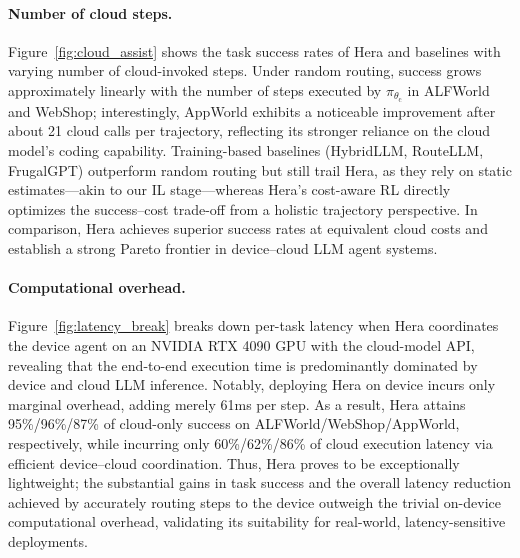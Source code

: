 \documentclass{article}
\newcommand{\needrev}[1]{{\color{darkgreen}#1}} %
\newcommand{\needrev}[1]{#1} %
\newcommand{\name}{Hera\xspace}
\begin{document}
\paragraph{Number of cloud steps.}
Figure~\ref{fig:cloud_assist} shows the task success rates of \name and baselines with varying number of cloud-invoked steps.
Under random routing, success grows approximately linearly with the number of steps executed by $\pi_{\theta_\mathrm{c}}$ in ALFWorld and WebShop; interestingly, AppWorld exhibits a noticeable improvement after about 21 cloud calls per trajectory, reflecting its stronger reliance on the cloud model’s coding capability.
Training-based baselines (HybridLLM, RouteLLM, FrugalGPT) outperform random routing but still trail \name, as they rely on static estimates—akin to our IL stage—whereas \name’s cost-aware RL directly optimizes the success--cost trade-off from a holistic trajectory perspective. In comparison, \name achieves superior success rates at equivalent cloud costs and establish a strong Pareto frontier in device--cloud LLM agent systems.

\vspace{-.5em}
\paragraph{Computational overhead.}
Figure~\ref{fig:latency_break} breaks down per-task latency when \name coordinates the device agent on an NVIDIA RTX 4090 GPU with the cloud-model API, revealing that the end-to-end execution time is predominantly dominated by device and cloud LLM inference.
Notably, deploying \name on device incurs only marginal overhead, adding merely 61ms per step.
As a result, \name attains 95\%/96\%/87\% of cloud-only success on ALFWorld/WebShop/AppWorld, respectively, while incurring only 60\%/62\%/86\% of cloud execution latency via efficient device--cloud coordination.
Thus, \name proves to be exceptionally lightweight; the substantial gains in task success and the overall latency reduction achieved by accurately routing steps to the device outweigh the trivial on-device computational overhead, validating its suitability for real-world, latency-sensitive deployments.
\end{document}
